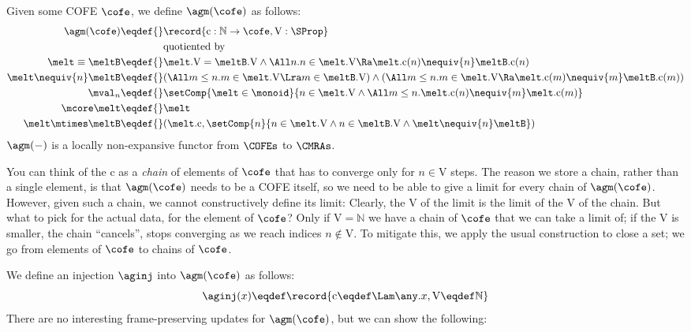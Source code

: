 Given some COFE $\cofe$, we define $\agm(\cofe)$ as follows:
\newcommand{\aginjc}{\mathrm{c}} %
\newcommand{\aginjV}{\mathrm{V}} %
\begin{align*}
  \agm(\cofe) \eqdef{}& \record{\aginjc : \mathbb{N} \to \cofe , \aginjV : \SProp} \\
  & \text{quotiented by} \\
  \melt \equiv \meltB \eqdef{}& \melt.\aginjV = \meltB.\aginjV \land \All n. n \in \melt.\aginjV \Ra \melt.\aginjc(n) \nequiv{n} \meltB.\aginjc(n) \\
  \melt \nequiv{n} \meltB \eqdef{}& (\All m \leq n. m \in \melt.\aginjV \Lra m \in \meltB.\aginjV) \land (\All m \leq n. m \in \melt.\aginjV \Ra \melt.\aginjc(m) \nequiv{m} \meltB.\aginjc(m)) \\
  \mval_n \eqdef{}& \setComp{\melt \in \monoid}{ n \in \melt.\aginjV \land \All m \leq n. \melt.\aginjc(n) \nequiv{m} \melt.\aginjc(m) } \\
  \mcore\melt \eqdef{}& \melt \\
  \melt \mtimes \meltB \eqdef{}& (\melt.\aginjc, \setComp{n}{n \in \melt.\aginjV \land n \in \meltB.\aginjV \land \melt \nequiv{n} \meltB })
\end{align*}
$\agm(-)$ is a locally non-expansive functor from $\COFEs$ to $\CMRAs$.

You can think of the $\aginjc$ as a \emph{chain} of elements of $\cofe$ that has to converge only for $n \in \aginjV$ steps.
The reason we store a chain, rather than a single element, is that $\agm(\cofe)$ needs to be a COFE itself, so we need to be able to give a limit for every chain of $\agm(\cofe)$.
However, given such a chain, we cannot constructively define its limit: Clearly, the $\aginjV$ of the limit is the limit of the $\aginjV$ of the chain.
But what to pick for the actual data, for the element of $\cofe$?
Only if $\aginjV = \mathbb{N}$ we have a chain of $\cofe$ that we can take a limit of; if the $\aginjV$ is smaller, the chain ``cancels'', \ie stops converging as we reach indices $n \notin \aginjV$.
To mitigate this, we apply the usual construction to close a set; we go from elements of $\cofe$ to chains of $\cofe$.

We define an injection $\aginj$ into $\agm(\cofe)$ as follows:
\[ \aginj(x) \eqdef \record{\mathrm c \eqdef \Lam \any. x, \mathrm V \eqdef \mathbb{N}} \]
There are no interesting frame-preserving updates for $\agm(\cofe)$, but we can show the following:
\begin{mathpar}

  
\end{mathpar}

